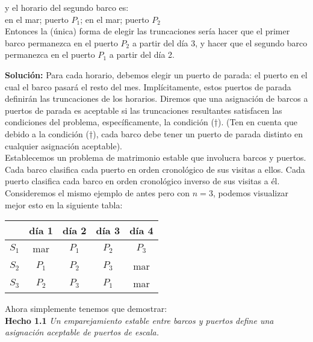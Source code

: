 \documentclass{article}
\begin{document}
y el horario del segundo barco es:\\

en el mar; puerto $P_1$; en el mar; puerto $P_2$\\

Entonces la (única) forma de elegir las truncaciones sería hacer que el primer barco permanezca en el puerto $P_2$ a partir del día 3, y hacer que el segundo barco permanezca en el puerto $P_1$ a partir del día 2.

\newpage

\textbf{Solución:} Para cada horario, debemos elegir un puerto de parada: el puerto en el cual el barco pasará el resto del mes. Implícitamente, estos puertos de parada definirán las truncaciones de los horarios. Diremos que una asignación de barcos a puertos de parada es aceptable si las truncaciones resultantes satisfacen las condiciones del problema, específicamente, la condición (†). (Ten en cuenta que debido a la condición (†), cada barco debe tener un puerto de parada distinto en cualquier asignación aceptable).\\

Establecemos un problema de matrimonio estable que involucra barcos y puertos. Cada barco clasifica cada puerto en orden cronológico de sus visitas a ellos. Cada puerto clasifica cada barco en orden cronológico inverso de sus visitas a él. Consideremos el mismo ejemplo de antes pero con $n = 3$, podemos visualizar mejor esto en la siguiente tabla:


\begin{center}
\begin{tabular}{ |c|c|c|c|c| } 
\hline
& día 1 & día 2 & día 3 & día 4 \\
\hline
$S_1$ & mar & $P_1$ & $P_2$ & \cellcolor{lightred}$P_3$ \\ 
\hline
$S_2$ & $P_1$ & \cellcolor{lightred}$P_2$ & $P_3$ & mar \\ 
\hline
$S_3$ & $P_2$ & $P_3$ & \cellcolor{lightred}$P_1$ & mar \\ 
\hline
\end{tabular}
\end{center}

Ahora simplemente tenemos que demostrar:\\

\textbf{Hecho 1.1} \textit{ Un emparejamiento estable entre barcos y puertos define una asignación aceptable de puertos de escala.}\\
\end{document}
